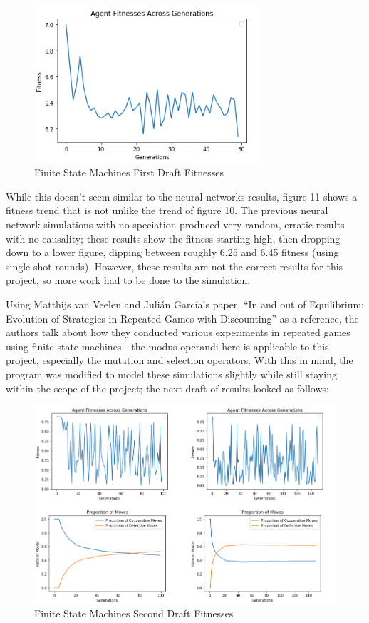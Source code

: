\documentclass[12pt,a4paper]{article}
\begin{document}
\begin{figure}[H]
	\centering
		\includegraphics[width=0.75\textwidth]{FSMFitnesses}
		\caption{Finite State Machines First Draft Fitnesses}
\end{figure}

While this doesn't seem similar to the neural networks results, figure 11 shows a fitness trend that is not unlike the trend of figure 10. The previous neural network simulations with no speciation produced very random, erratic results with no causality; these results show the fitness starting high, then dropping down to a lower figure, dipping between roughly 6.25 and 6.45 fitness (using single shot rounds). However, these results are not the correct results for this project, so more work had to be done to the simulation.

Using Matthijs van Veelen and Julián García's paper, “In and out of Equilibrium: Evolution of Strategies in Repeated Games with Discounting”\cite[p.~14]{46} as a reference, the authors talk about how they conducted various experiments in repeated games using finite state machines - the modus operandi here is applicable to this project, especially the mutation and selection operators. With this in mind, the program was modified to model these simulations slightly while still staying within the scope of the project; the next draft of results looked as follows:

\begin{figure}[H]
	\centering
		\includegraphics[width=1.0\textwidth]{NewFSMFitnesses}
		\caption{Finite State Machines Second Draft Fitnesses}
\end{figure}
\end{document}

